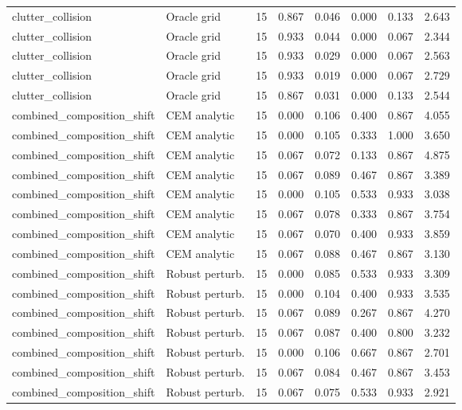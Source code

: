 {\begin{longtable}{llrrrrrr}
clutter\_collision & Oracle grid & 15 & 0.867 & 0.046 & 0.000 & 0.133 & 2.643 \\
clutter\_collision & Oracle grid & 15 & 0.933 & 0.044 & 0.000 & 0.067 & 2.344 \\
clutter\_collision & Oracle grid & 15 & 0.933 & 0.029 & 0.000 & 0.067 & 2.563 \\
clutter\_collision & Oracle grid & 15 & 0.933 & 0.019 & 0.000 & 0.067 & 2.729 \\
clutter\_collision & Oracle grid & 15 & 0.867 & 0.031 & 0.000 & 0.133 & 2.544 \\
combined\_composition\_shift & CEM analytic & 15 & 0.000 & 0.106 & 0.400 & 0.867 & 4.055 \\
combined\_composition\_shift & CEM analytic & 15 & 0.000 & 0.105 & 0.333 & 1.000 & 3.650 \\
combined\_composition\_shift & CEM analytic & 15 & 0.067 & 0.072 & 0.133 & 0.867 & 4.875 \\
combined\_composition\_shift & CEM analytic & 15 & 0.067 & 0.089 & 0.467 & 0.867 & 3.389 \\
combined\_composition\_shift & CEM analytic & 15 & 0.000 & 0.105 & 0.533 & 0.933 & 3.038 \\
combined\_composition\_shift & CEM analytic & 15 & 0.067 & 0.078 & 0.333 & 0.867 & 3.754 \\
combined\_composition\_shift & CEM analytic & 15 & 0.067 & 0.070 & 0.400 & 0.933 & 3.859 \\
combined\_composition\_shift & CEM analytic & 15 & 0.067 & 0.088 & 0.467 & 0.867 & 3.130 \\
combined\_composition\_shift & Robust perturb. & 15 & 0.000 & 0.085 & 0.533 & 0.933 & 3.309 \\
combined\_composition\_shift & Robust perturb. & 15 & 0.000 & 0.104 & 0.400 & 0.933 & 3.535 \\
combined\_composition\_shift & Robust perturb. & 15 & 0.067 & 0.089 & 0.267 & 0.867 & 4.270 \\
combined\_composition\_shift & Robust perturb. & 15 & 0.067 & 0.087 & 0.400 & 0.800 & 3.232 \\
combined\_composition\_shift & Robust perturb. & 15 & 0.000 & 0.106 & 0.667 & 0.867 & 2.701 \\
combined\_composition\_shift & Robust perturb. & 15 & 0.067 & 0.084 & 0.467 & 0.867 & 3.453 \\
combined\_composition\_shift & Robust perturb. & 15 & 0.067 & 0.075 & 0.533 & 0.933 & 2.921 \\

\end{longtable}}

